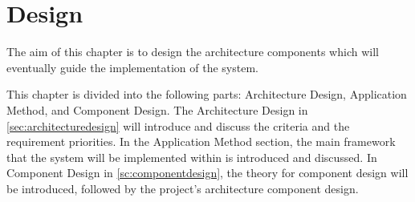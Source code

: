 \documentclass[../../master.tex]{subfiles}
\begin{document}
\chapter{Design}\label{ch:design}
The aim of this chapter is to design the architecture components which will eventually guide the implementation of the system.

This chapter is divided into the following parts: Architecture Design, Application Method, and Component Design.
The Architecture Design in \cref{sec:architecturedesign} will introduce and discuss the criteria and the requirement priorities.
In the Application Method section, the main framework that the system will be implemented within is introduced and discussed.
In Component Design in \cref{sc:componentdesign}, the theory for component design will be introduced, followed by the project's architecture component design.





\end{document}

